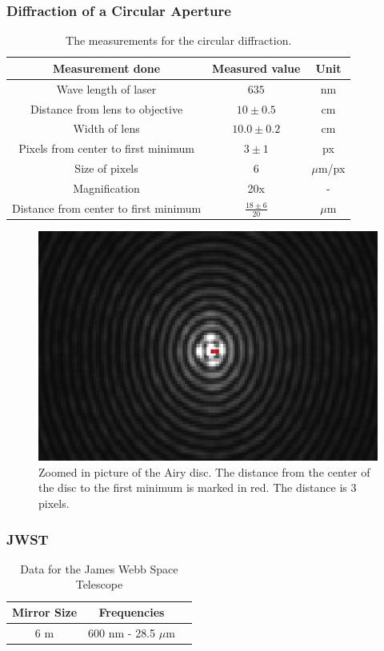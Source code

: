 \documentclass{emulateapj}
\begin{document}
\subsubsection{Diffraction of a Circular Aperture}

\begin{table}[H]
\begin{tabular}{ c c c }
Measurement done & Measured value & Unit\\
\hline
Wave length of laser & $635$ & nm \\
Distance from lens to objective & $10 \pm 0.5$ & cm\\
Width of lens & $10.0 \pm 0.2$ & cm\\
Pixels from center to first minimum & $3 \pm 1$ & px\\
Size of pixels & $6$ & $\mu$m/px\\
Magnification & 20x & -\\
Distance from center to first minimum & $\frac{18 \pm 6}{20}$& $\mu$m
\end{tabular}
\caption{The measurements for the circular diffraction.}
\end{table}\label{tab:dataAiry}

\begin{figure}[H]
\centering
\includegraphics[scale=0.4]{Airy3zoomed2.png}
\caption{Zoomed in picture of the Airy disc. The distance from the center of the disc to the first minimum is marked in red. The distance is 3 pixels.}
\end{figure}

\subsubsection{JWST}
\begin{table}[H]
\centering
\begin{tabular}{ c c c }
Mirror Size & Frequencies \\
\hline
6 m & 600 nm - 28.5 $\mu$m 
\end{tabular}
\caption{Data for the James Webb Space Telescope}
\end{table}\label{tab:dataJWST}
\end{document}
